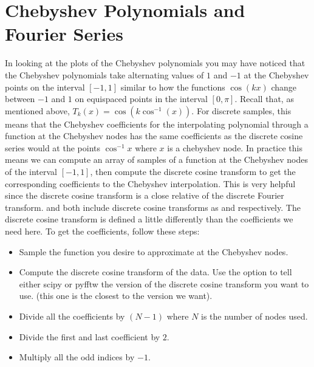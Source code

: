 \section*{Chebyshev Polynomials and Fourier Series}
In looking at the plots of the Chebyshev polynomials you may have noticed that the Chebyshev polynomials take alternating values of $1$ and $-1$ at the Chebyshev points on the interval $[-1,1]$ similar to how the functions $\cos\left(k x \right)$ change between $-1$ and $1$ on equispaced points in the interval $[ 0 , \pi ]$.
Recall that, as mentioned above, $T_k \left( x \right) = \cos \left( k \cos^{-1} \left( x \right) \right)$.
For discrete samples, this means that the Chebyshev coefficients for the interpolating polynomial through a function at the Chebyshev nodes has the same coefficients as the discrete cosine series would at the points $\cos^{-1} x$ where $x$ is a chebyshev node.
In practice this means we can compute an array of samples of a function at the Chebyshev nodes of the interval $[-1, 1]$, then compute the discrete cosine transform to get the corresponding coefficients to the Chebyshev interpolation.
This is very helpful since the discrete cosine transform is a close relative of the discrete Fourier transform.
 and  both include discrete cosine transforms as  and  respectively.
The discrete cosine transform is defined a little differently than the coefficients we need here.
To get the coefficients, follow these steps:

\begin{itemize}

\item Sample the function you desire to approximate at the Chebyshev nodes.

\item Compute the discrete cosine transform of the data.
Use the option  to tell either scipy or pyfftw the version of the discrete cosine transform you want to use. (this one is the closest to the version we want).

\item Divide all the coefficients by $\left( N - 1 \right)$ where $N$ is the number of nodes used.

\item Divide the first and last coefficient by $2$.

\item Multiply all the odd indices by $-1$.

\end{itemize}

